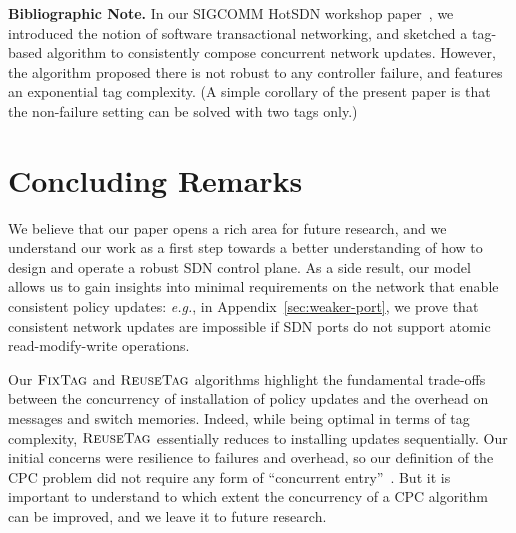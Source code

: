 \documentclass[11pt,pdftex,letter]{article}
\newcommand{\CPO}{\textsc{FixTag}}
\newcommand{\DPO}{\textsc{ReuseTag}}
\newcommand{\eg}{{\it e.g.}}
\begin{document}
\noindent
\textbf{Bibliographic Note.} In our SIGCOMM HotSDN workshop
paper~\cite{hotsdn13ccc}, we introduced the notion of software transactional
networking, and sketched a tag-based algorithm to consistently compose
concurrent network updates. However, the algorithm proposed there
is not robust to any controller failure, and features an exponential
tag complexity. (A simple corollary of the present paper is that the non-failure
setting can be solved with two tags only.)


\section{Concluding Remarks}\label{sec:conc}

We believe that our paper opens a rich area for future research,
and we understand our work as a first step towards a better understanding of
how to design and operate a robust SDN control plane.
%
As a side result, our model allows us to gain insights into minimal requirements
on the network that enable consistent policy updates: \eg, in Appendix~\ref{sec:weaker-port}, we
prove that consistent network updates are impossible if SDN ports do not support
atomic read-modify-write operations.
%

Our $\CPO$ and $\DPO$ algorithms highlight the fundamental trade-offs
between the concurrency of installation of policy updates and the
overhead on messages and switch memories.
Indeed, while being optimal in terms of tag complexity, $\DPO$
essentially reduces to installing updates sequentially.
Our initial concerns were resilience to failures and overhead, so our
definition of the CPC problem did not require any form of
``concurrent entry''~\cite{GME-00}.
But it is important to understand to which extent the concurrency of a
CPC algorithm can be improved, and we leave it to future research.
\end{document}
